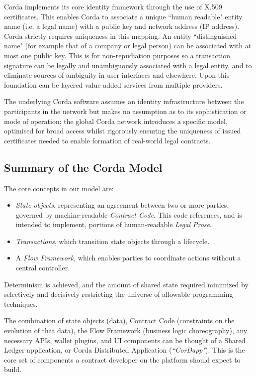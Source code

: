 \documentclass{article}
\begin{document}
Corda implements its core identity framework through the use of X.509 certificates. This enables Corda to associate a unique ``human readable" entity name (i.e. a legal name) with a public key and network address (IP address). Corda strictly requires uniqueness in this mapping. An entity ``distinguished name" (for example that of a company or legal person) can be associated with at most one public key. This is for non-repudiation purposes so a transaction signature can be legally and unambiguously associated with a legal entity, and to eliminate sources of ambiguity in user interfaces and elsewhere. Upon this foundation can be layered value added services from multiple providers.

The underlying Corda software assumes an identity infrastructure between the participants in the network but makes no assumption as to its sophistication or mode of operation; the global Corda network introduces a specific model, optimised for broad access whilst rigorously ensuring the uniqueness of issued certificates needed to enable formation of real-world legal contracts.

\subsection{Summary of the Corda Model}
The core concepts in our model are:
\begin{itemize}

\item \textit{State objects}, representing an agreement between two or more parties, governed by machine-readable \textit{Contract Code}. This code references, and is intended to implement, portions of human-readable \textit{Legal Prose}. \item \textit{Transactions}, which transition state objects through a lifecycle.
\item A \textit{Flow Framework}, which enables parties to coordinate actions without a central controller.
\end{itemize}

Determinism is achieved, and the amount of shared state required minimized by selectively and decisively restricting the universe of allowable programming techniques.

The combination of state objects (data), Contract Code (constraints on the evolution of that data), the Flow Framework (business logic choreography), any necessary APIs, wallet plugins, and UI components can be thought of a Shared Ledger application, or Corda Distributed Application (\textit{``CorDapp"}). This is the core set of components a contract developer on the platform should expect to build.
\end{document}
